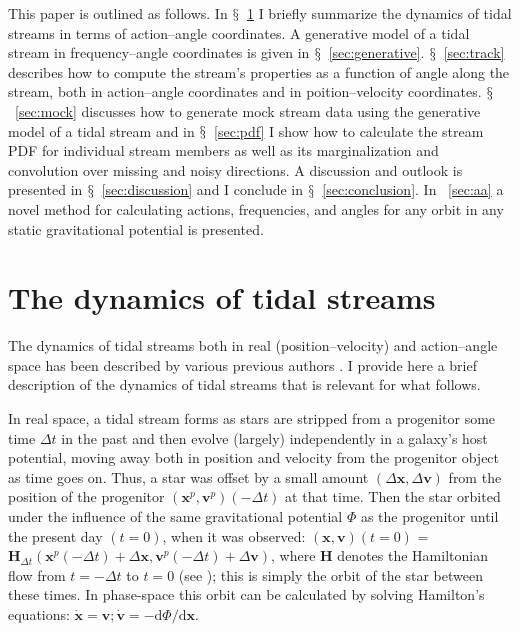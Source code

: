 \documentclass[12pt,preprint]{aastex}
\newcommand{\dd}{\mathrm{d}}
\newcommand{\eg}{e.g.}
\newcommand{\sectionname}{$\mathsection$}
\renewcommand{\vec}[1]{\ensuremath{\mathbf{#1}}}
\newcommand{\vecx}{\ensuremath{\vec{x}}}
\newcommand{\vecv}{\ensuremath{\vec{v}}}
\newcommand{\vech}{\ensuremath{\vec{H}}}
\begin{document}
This paper is outlined as follows. In \sectionname~\ref{sec:dynamics}
I briefly summarize the dynamics of tidal streams in terms of
action--angle coordinates. A generative model of a tidal stream in
frequency--angle coordinates is given in
\sectionname~\ref{sec:generative}. \sectionname~\ref{sec:track}
describes how to compute the stream's properties as a function of
angle along the stream, both in action--angle coordinates and in
poition--velocity coordinates. \sectionname~\ref{sec:mock} discusses
how to generate mock stream data using the generative model of a tidal
stream and in \sectionname~\ref{sec:pdf} I show how to calculate the
stream PDF for individual stream members as well as its
marginalization and convolution over missing and noisy directions. A
discussion and outlook is presented in
\sectionname~\ref{sec:discussion} and I conclude in
\sectionname~\ref{sec:conclusion}. In \appendixname~\ref{sec:aa} a
novel method for calculating actions, frequencies, and angles for any
orbit in any static gravitational potential is presented.


\section{The dynamics of tidal streams}\label{sec:dynamics}

The dynamics of tidal streams both in real (position--velocity) and
action--angle space has been described by various previous authors
\citep[\eg,][]{Helmi99a,Tremaine99a,Johnston99a,Sanders13b}. I provide
here a brief description of the dynamics of tidal streams that is
relevant for what follows.

In real space, a tidal stream forms as stars are stripped from a
progenitor some time $\Delta t$ in the past and then evolve (largely)
independently in a galaxy's host potential, moving away both in
position and velocity from the progenitor object as time goes
on. Thus, a star was offset by a small amount $(\Delta \vecx,\Delta
\vecv)$ from the position of the progenitor $(\vecx^p,\vecv^p)(-\Delta
t)$ at that time. Then the star orbited under the influence of the
same gravitational potential $\Phi$ as the progenitor until the
present day $(t=0)$, when it was observed: $(\vecx,\vecv)(t=0)$ =
$\vech_{\Delta t}(\vecx^p(-\Delta t)+\Delta \vecx,\vecv^p(-\Delta
t)+\Delta \vecv)$, where $\vech$ denotes the Hamiltonian flow from
$t=-\Delta t$ to $t=0$ (see \citealt{binneytremaine}); this is simply
the orbit of the star between these times. In phase-space this orbit
can be calculated by solving Hamilton's equations: $\dot{\vecx} =
\vecv; \dot{\vecv} = - \dd \Phi / \dd \vecx$.
\end{document}
